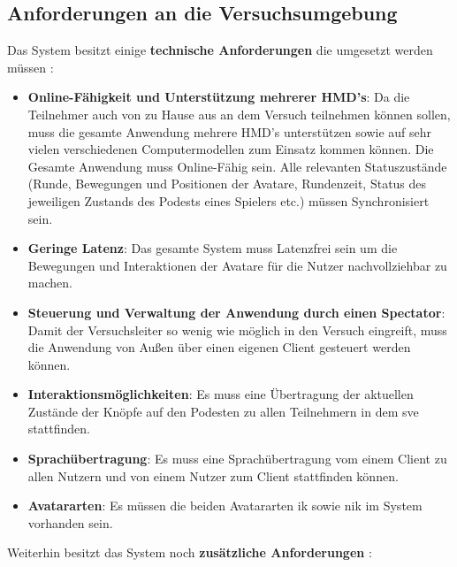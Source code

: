 \documentclass[a4paper,11pt]{article}%
\renewcommand{\\}{\vspace*{0.5\baselineskip} \newline}
\begin{document}
\newpage
	\subsection{Anforderungen an die Versuchsumgebung}

Das System besitzt einige \textbf{technische Anforderungen} die umgesetzt werden müssen :
\begin{itemize}
\item \textbf{Online-Fähigkeit und Unterstützung mehrerer HMD's}: Da die Teilnehmer auch von zu Hause aus an dem Versuch teilnehmen können sollen, muss die gesamte Anwendung mehrere HMD's unterstützen sowie auf sehr vielen verschiedenen Computermodellen zum Einsatz kommen können. Die Gesamte Anwendung muss Online-Fähig sein. Alle relevanten Statuszustände (Runde, Bewegungen und Positionen der Avatare, Rundenzeit, Status des jeweiligen Zustands des Podests eines Spielers etc.) müssen Synchronisiert sein.
\item \textbf{Geringe Latenz}: Das gesamte System muss Latenzfrei sein um die Bewegungen und Interaktionen der Avatare für die Nutzer nachvollziehbar zu machen.
\item \textbf{Steuerung und Verwaltung der Anwendung durch einen Spectator}: Damit der Versuchsleiter so wenig wie möglich in den Versuch eingreift, muss die Anwendung von Außen über einen eigenen Client gesteuert werden können.
\item \textbf{Interaktionsmöglichkeiten}: Es muss eine Übertragung der aktuellen Zustände der Knöpfe auf den Podesten zu allen Teilnehmern in dem \ac{sve} stattfinden.
\item \textbf{Sprachübertragung}: Es muss eine Sprachübertragung vom einem Client zu allen Nutzern und von einem Nutzer zum Client stattfinden können.
\item \textbf{Avatararten}: Es müssen die beiden Avatararten \ac{ik} sowie \ac{nik} im System vorhanden sein.
\end{itemize}

Weiterhin besitzt das System noch \textbf{zusätzliche Anforderungen} :
\end{document}
